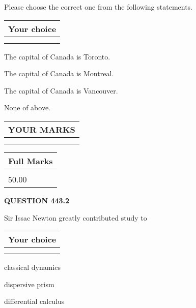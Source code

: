 \documentclass[12pt]{article}
\begin{document}
  
Please choose the correct one from the following statements.
  
  
\noindent\hspace{3.0in} \begin{tabular}{|l|}
\hline
Your choice \\
\hline
 \\ 
 \\ 
\hline
\end{tabular}
  
  
 
 
The capital of Canada is Toronto.
 
 
The capital of Canada is Montreal.
 
 
The capital of Canada is Vancouver.
 
 
 None of above.
 
 
  
\vspace{0.2in}
  
\noindent\begin{tabular}{|l|}
\hline
 YOUR MARKS  \\
\hline
 \\ 
 \\ 
\hline
\end{tabular}
\hspace{0.05in} \begin{tabular}{|l|}
\hline
 Full Marks  \\
\hline
 \\ 
50.00 \\
\hline
\end{tabular}
{\textbf{\Large{QUESTION
443.2 
}}}
  
  
Sir Issac Newton greatly contributed study to
  
  
\noindent\hspace{3.0in} \begin{tabular}{|l|}
\hline
Your choice \\
\hline
 \\ 
 \\ 
\hline
\end{tabular}
  
  
 
 
classical dynamics
 
 
dispersive prism
 
 
differential calculus
 
\end{document}
